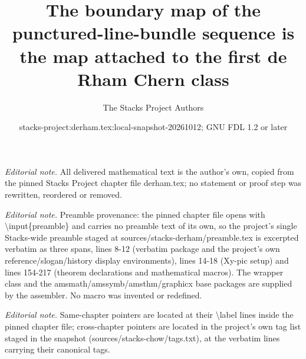 \documentclass[10pt,a4paper]{amsart}
\title{The boundary map of the punctured-line-bundle sequence is the map attached to the first de Rham Chern class}
\author{The Stacks Project Authors}
\date{stacks-project:derham.tex:local-snapshot-20261012; GNU FDL 1.2 or later}
\theoremstyle{plain}
\theoremstyle{definition}
\theoremstyle{remark}
\numberwithin{equation}{subsection}
\begin{document}
\maketitle
\noindent\textit{Editorial note.} All delivered mathematical text is the author's own, copied from the pinned Stacks Project chapter file derham.tex; no statement or proof step was rewritten, reordered or removed.\par\medskip
\noindent\textit{Editorial note.} Preamble provenance: the pinned chapter file opens with \textbackslash{}input\{preamble\} and carries no preamble text of its own, so the project's single Stacks-wide preamble staged at sources/stacks-derham/preamble.tex is excerpted verbatim as three spans, lines 8-12 (verbatim package and the project's own reference/slogan/history display environments), lines 14-18 (Xy-pic setup) and lines 154-217 (theorem declarations and mathematical macros). The wrapper class and the amsmath/amssymb/amsthm/graphicx base packages are supplied by the assembler. No macro was invented or redefined.\par\medskip
\noindent\textit{Editorial note.} Same-chapter pointers are located at their \textbackslash{}label lines inside the pinned chapter file; cross-chapter pointers are located in the project's own tag list staged in the snapshot (sources/stacks-chow/tags.txt), at the verbatim lines carrying their canonical tags.\par\medskip
\end{document}
